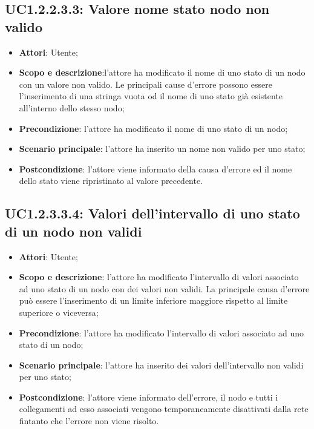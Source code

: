\subsection{UC1.2.2.3.3: Valore nome stato nodo non valido} 
\hypertarget{UC1.2.2.3.3}{} 
\begin{itemize} 
	\item{\textbf{Attori}: Utente;} 
	\item{\textbf{Scopo e descrizione}:l'attore ha modificato il nome di uno stato di un nodo con un valore non valido. Le principali cause d'errore possono essere l'inserimento di una stringa vuota od il nome di uno stato già esistente all'interno dello stesso nodo;} 
	\item{\textbf{Precondizione}: l'attore ha modificato il nome di uno stato di un nodo;} 
	\item{\textbf{Scenario principale}: l'attore ha inserito un nome non valido per uno stato;}
	\item{\textbf{Postcondizione}: l'attore viene informato della causa d'errore ed il nome dello stato viene ripristinato al valore precedente.} 
\end{itemize}
\subsection{UC1.2.3.3.4: Valori dell'intervallo di uno stato di un nodo non validi} 
\hypertarget{UC1.2.2.3.4}{} 
\begin{itemize} 
	\item{\textbf{Attori}: Utente;} 
	\item{\textbf{Scopo e descrizione}: l'attore ha modificato l'intervallo di valori associato ad uno stato di un nodo con dei valori non validi. La principale causa d'errore può essere l'inserimento di un limite inferiore maggiore rispetto al limite superiore o viceversa;} 
	\item{\textbf{Precondizione}: l'attore ha modificato l'intervallo di valori associato ad uno stato di un nodo;}
	\item{\textbf{Scenario principale}: l'attore ha inserito dei valori dell'intervallo non validi per uno stato;} 
	\item{\textbf{Postcondizione}: l'attore viene informato dell'errore, il nodo e tutti i collegamenti ad esso associati vengono temporaneamente disattivati dalla rete fintanto che l'errore non viene risolto.} 
\end{itemize}
